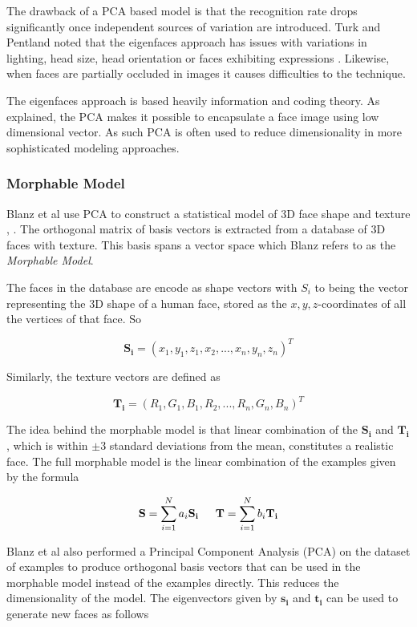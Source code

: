 \documentclass[11pt,a4paper]{report}
\begin{document}
The drawback of a PCA based model is that the recognition rate drops significantly once
independent sources of variation are introduced. Turk and
Pentland noted that the eigenfaces approach has issues with variations in lighting,
head size, head orientation or faces exhibiting expressions \cite{eigenfaces91}. Likewise, when
faces are partially occluded in images it causes difficulties to the technique. 

The eigenfaces approach is based heavily information and coding theory. As
explained, the PCA makes it possible to encapsulate a face image
using low dimensional vector. As such PCA is often used to
reduce dimensionality in more sophisticated modeling approaches.

\subsubsection{Morphable Model}
Blanz et al use PCA to construct a statistical model of 3D face shape and
texture \cite{blanz1}, \cite{blanz2}. The orthogonal matrix of basis vectors is
extracted from a database of 3D faces with texture. This basis spans a vector
space which Blanz refers to as the \textit{Morphable Model}.

The faces in the database are encode as shape vectors with $S_i$ to being the vector representing the 3D shape of a human
face, stored as the $x,y,z$-coordinates of all the vertices of that face. So

\begin{equation}
\mathbf{S_i} = (x_1,y_1,z_1,x_2,...,x_n,y_n,z_n)^T
\end{equation}

Similarly, the texture vectors are defined as

\begin{equation}
\mathbf{T_i} = (R_1,G_1,B_1,R_2,...,R_n,G_n,B_n)^T
\end{equation}

The idea behind the morphable model is that linear combination of the
$\mathbf{S_i}$ and $\mathbf{T_i}$, which is within $\pm 3$ standard deviations
from the mean, constitutes a realistic face. The full
morphable model is the linear combination of the examples given by the formula

\begin{equation}
\mathbf{S} = \sum_{i=1}^Na_i \mathbf{S_i} \indent \mathbf{T} = \sum_{i=1}^Nb_i \mathbf{T_i}
\end{equation}

Blanz et al also performed a Principal Component Analysis (PCA) on the dataset of examples
to produce orthogonal basis vectors that can be used in the morphable
model instead of the examples directly. This reduces the dimensionality of the
model. The eigenvectors given by $\mathbf{s_i}$ and $\mathbf{t_i}$ can be used
to generate new faces as follows
\end{document}
